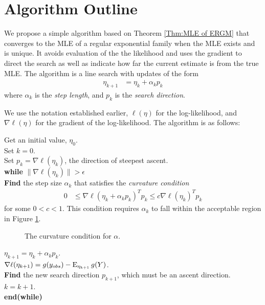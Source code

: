 \section{Algorithm Outline}
We propose a simple algorithm based on Theorem \ref{Thm:MLE of ERGM} that converges to the MLE of a regular exponential family when the MLE exists and is unique.  It avoids evaluation of the the likelihood and uses the gradient to direct the search as well as indicate how far the current estimate is from the true MLE.  The algorithm is a line search with updates of the form
\begin{align*}
	\eta_{k+1} &= \eta_k + \alpha_k p_k
\end{align*}
where $\alpha_k$ is the \emph{step length}, and $p_k$ is the \emph{search direction}.
 
We use the notation established earlier, $\ell(\eta)$ for the log-likelihood, and $\nabla \ell( \eta)$ for the gradient of the log-likelihood. The algorithm is as follows:


Get an initial value, $\eta_0$.\\ 
Set $k=0$. \\
Set $p_k = \nabla \ell( \eta_k)$, the direction of steepest ascent. \\
\textbf{while}  $\parallel \nabla \ell( \eta_k) \parallel > \epsilon$ \\ 
\hspace{4mm} \indent	 \textbf{Find} the step size $\alpha_k$ that satisfies the \textit{curvature condition}
\begin{align*}
	 0 & \leq \nabla \ell( \eta_k + \alpha_k p_k)^T p_k \leq c \nabla \ell(\eta_k)^T p_k
\end{align*}
\indent for some $0 < c < 1$.  This condition requires $\alpha_k$ to fall within the acceptable region in Figure \ref{F:alpha_region}. \\

\begin{figure}[!h]
\centering
    \scalebox{.4}{}
	\caption{The curvature condition for $\alpha$.}
\label{F:alpha_region}
\end{figure}

$\eta_{k+1} = \eta_k + \alpha_k p_k$.\\
\indent $\nabla \ell( \eta_{k+1}) = g( y _{obs}) - \operatorname{E}_{\eta_{k+1}}g(Y)$.\\
\indent \textbf{Find} the new search direction $p_{k+1}$, which must be an ascent direction. \\
\indent $k = k + 1$.  \\
\textbf{end(while)}

